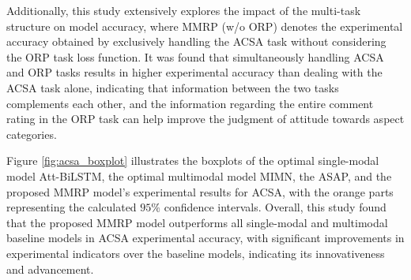 \documentclass[preprint,12pt]{elsarticle}
\begin{document}
Additionally, this study extensively explores the impact of the multi-task structure on model accuracy, where MMRP (w/o ORP) denotes the experimental accuracy obtained by exclusively handling the ACSA task without considering the ORP task loss function. It was found that simultaneously handling ACSA and ORP tasks results in higher experimental accuracy than dealing with the ACSA task alone, indicating that information between the two tasks complements each other, and the information regarding the entire comment rating in the ORP task can help improve the judgment of attitude towards aspect categories. 

Figure \ref{fig:acsa_boxplot} illustrates the boxplots of the optimal single-modal model Att-BiLSTM, the optimal multimodal model MIMN, the ASAP, and the proposed MMRP model's experimental results for ACSA, with the orange parts representing the calculated $95\%$ confidence intervals. Overall, this study found that the proposed MMRP model outperforms all single-modal and multimodal baseline models in ACSA experimental accuracy, with significant improvements in experimental indicators over the baseline models, indicating its innovativeness and advancement.



\end{document}
